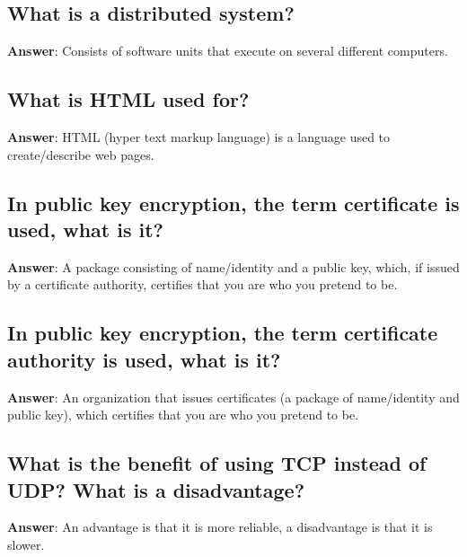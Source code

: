 \documentclass[a4paper,11pt,oneside]{article}
\begin{document}
\begin{sloppypar}
\subsection{What is a distributed system?}

\label{q:159:sa:en:True}

\textbf{Answer}: Consists of software units that execute on several different computers.



\subsection{What is HTML used for?}

\label{q:160:sa:en:True}

\textbf{Answer}: HTML (hyper text markup language) is a language used to create/describe web pages.



\subsection{In public key encryption, the term certificate is used, what is it?}

\label{q:161:sa:en:True}

\textbf{Answer}: A package consisting of name/identity and a public key, which, if issued by a certificate authority, certifies that you are who you pretend to be.



\subsection{In public key encryption, the term certificate authority is used, what is it?}

\label{q:162:sa:en:True}

\textbf{Answer}: An organization that issues certificates (a package of name/identity and public key), which certifies that you are who you pretend to be.



\subsection{What is the benefit of using TCP instead of UDP? What is a disadvantage?}

\label{q:163:sa:en:True}

\textbf{Answer}: An advantage is that it is more reliable, a disadvantage is that it is slower.




\end{sloppypar}
\end{document}

